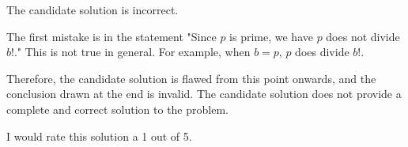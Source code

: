 The candidate solution is incorrect.

The first mistake is in the statement "Since \( p \) is prime, we have \( p \) does not divide \( b! \)." This is not true in general. For example, when \( b = p \), \( p \) does divide \( b! \). 

Therefore, the candidate solution is flawed from this point onwards, and the conclusion drawn at the end is invalid. The candidate solution does not provide a complete and correct solution to the problem. 

I would rate this solution a 1 out of 5.

